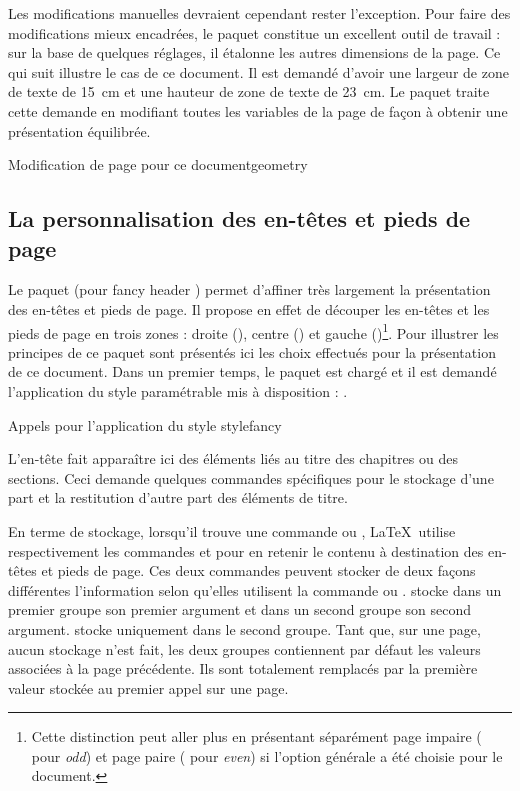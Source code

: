Les modifications manuelles devraient cependant rester l'exception. Pour faire des modifications mieux encadrées, le paquet  constitue un excellent outil de travail : sur la base de quelques réglages, il étalonne les autres dimensions de la page. Ce qui suit illustre le cas de ce document. Il est demandé d'avoir une largeur de zone de texte de 15~cm et une hauteur de zone de texte de 23~cm. Le paquet  traite cette demande en modifiant toutes les variables de la page de façon à obtenir une présentation équilibrée. 

\begin{codesimple}{Modification de page pour ce document}{geometry}
\usepackage[body={15cm,23cm}]{geometry}
\end{codesimple}


\subsection{La personnalisation des en-têtes et pieds de page} \label{fancyhdr}

Le paquet  (pour \og fancy header \fg) permet d'affiner très largement la présentation des en-têtes et pieds de page. Il propose en effet de découper les en-têtes et les pieds de page en trois zones : droite (), centre () et gauche ()\footnote{Cette distinction peut aller plus en présentant séparément page impaire ( pour \emph{odd}) et page paire ( pour \emph{even}) si l'option générale  a été choisie pour le document.}. Pour illustrer les principes de ce paquet sont présentés ici les choix effectués pour la présentation de ce document. Dans un premier temps, le paquet est chargé et il est demandé l'application du style paramétrable mis à disposition : .

\begin{codesimple}{Appels pour l'application du style }{stylefancy}
\usepackage{fancyhdr}
\pagestyle{fancy}
\end{codesimple}

L'en-tête fait apparaître ici des éléments liés au titre des chapitres ou des sections. Ceci demande quelques  commandes spécifiques pour le stockage d'une part et la restitution d'autre part des éléments de titre.

En terme de stockage, lorsqu'il trouve une  commande  ou , \LaTeX\ utilise respectivement les  commandes  et  pour en retenir le contenu à destination des en-têtes et pieds de page. Ces deux  commandes peuvent stocker de deux façons différentes l'information selon qu'elles utilisent la  commande  ou .   stocke dans un premier groupe son premier argument et dans un second groupe son second argument.  stocke uniquement dans le second groupe. Tant que, sur une page, aucun stockage n'est fait, les deux groupes contiennent par défaut les valeurs associées à la page précédente. Ils sont totalement remplacés par la première valeur stockée au premier appel sur une page.


